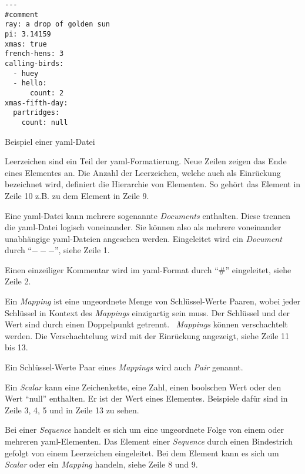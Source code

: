 \begin{listing}[htp]
      \begin{verbatim}
---
#comment
ray: a drop of golden sun
pi: 3.14159
xmas: true
french-hens: 3
calling-birds:
  - huey
  - hello:
      count: 2
xmas-fifth-day:
  partridges:
    count: null
      \end{verbatim}
      \caption{Beispiel einer \acs{yaml}-Datei}
      \label{lst:yaml-example}
\end{listing}

\begin{description}
      \setlength\itemsep{-0.5cm}
      \item[Einrückung und Leerzeichen]
            Leerzeichen sind ein Teil der \acs{yaml}-Formatierung. Neue Zeilen zeigen das Ende eines Elementes an.
            Die Anzahl der Leerzeichen, welche auch als Einrückung bezeichnet wird, definiert die Hierarchie von Elementen.
            So gehört das Element in Zeile 10 z.B. zu dem Element in Zeile 9.
      \item[Document]
            Eine \ac{yaml}-Datei kann mehrere sogenannte \textit{Documents} enthalten. Diese trennen die \ac{yaml}-Datei logisch voneinander.
            Sie können also als mehrere voneinander unabhängige \ac{yaml}-Dateien angesehen werden.
            Eingeleitet wird ein \textit{Document}
            durch ``$---$'', siehe Zeile 1.
      \item[Kommentare]
            Einen einzeiliger Kommentar wird im \ac{yaml}-Format durch ``$\#$'' eingeleitet, siehe Zeile 2.
      \item[Mapping]
            Ein \textit{Mapping} ist eine ungeordnete Menge von Schlüssel-Werte Paaren, wobei jeder Schlüssel
            in Kontext des \textit{Mappings} einzigartig sein muss.
            Der Schlüssel und der Wert sind durch einen Doppelpunkt getrennt.
            \ \textit{Mappings} können verschachtelt werden.
            Die Verschachtelung wird mit der Einrückung angezeigt, siehe Zeile 11 bis 13.
      \item[Pair]
            Ein Schlüssel-Werte Paar eines \textit{Mappings} wird auch \textit{Pair} genannt.
      \item[Scalar]
            Ein \textit{Scalar} kann eine Zeichenkette, eine Zahl, einen boolschen Wert oder den Wert ``null'' enthalten.
            Er ist der Wert eines Elementes.
            Beispiele dafür sind in Zeile 3, 4, 5 und in Zeile 13 zu sehen.
      \item[Sequence]
            Bei einer \textit{Sequence} handelt es sich um eine ungeordnete Folge von einem oder mehreren \ac{yaml}-Elementen.
            Das Element einer \textit{Sequence} durch einen Bindestrich gefolgt von einem Leerzeichen eingeleitet.
            Bei dem Element kann es sich um \textit{Scalar} oder ein \textit{Mapping} handeln, siehe Zeile 8 und 9.

\end{description}


